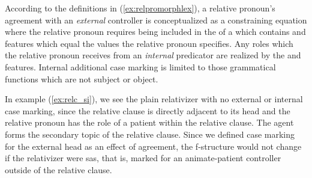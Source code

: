 According to the definitions in (\ref{ex:relpromorphlex}), a relative pronoun's
agreement with an \emph{external} controller is conceptualized as a
constraining equation where the relative pronoun requires being included in the
\Adjc{} of a \GF{} which contains \Case{} and \Anim{} features which equal the
values the relative pronoun specifies. Any roles which the relative pronoun
receives from an \emph{internal} predicator are realized by the \Case{} and
\Anim{} features. Internal additional case marking is limited to those
grammatical functions which are not subject or object.

In example (\ref{ex:relc_si}), we see the plain relativizer  with
no external or internal case marking, since the relative clause is directly
adjacent to its head and the relative pronoun has the role of a patient within
the relative clause. The agent forms the secondary topic of the relative
clause. Since we defined case marking for the external head as an effect of
agreement, the f-structure would not change if the relativizer were 
{sas}, that is, marked for an animate-patient controller outside of the
relative clause.

